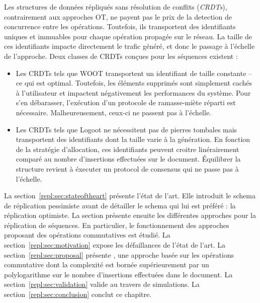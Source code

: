 Les structures de données répliqués sans résolution de conflits (\emph{CRDTs}),
contrairement aux approches OT, ne payent pas le prix de la detection de
concurrence entre les opérations. Toutefois, ils transportent des identifiants
uniques et immuables pour chaque opération propagée sur le réseau. La taille de
ces identifiants impacte directement le trafic généré, et donc le passage à
l'échelle de l'approche. Deux classes de CRDTs conçues pour les séquences
existent :

\begin{itemize}
\item Les CRDTs tels que WOOT transportent un identifiant de taille constante --
ce qui est optimal. Toutefois, les éléments supprimés sont simplement cachés à
l'utilisateur et impactent négativement les performances du système. Pour s'en
débarasser, l'exécution d'un protocole de ramasse-miète réparti est
nécessaire. Malheureusement, ceux-ci ne passent pas à l'échelle.

\item Les CRDTs tels que Logoot ne nécessitent pas de pierres tombales mais
transportent des identifiants dont la taille varie à la génération. En fonction
de la stratégie d'allocation, ces identifiants peuvent croitre linérairement
comparé au nombre d'insertions effectuées sur le document. Équilibrer la
structure revient à éxecuter un protocol de consensus qui ne passe pas à
l'échelle.
\end{itemize}


La section~\ref{repl:sec:stateoftheart} présente l'état de l'art. Elle introduit
le schema de réplication pessimiste avant de détailler le schema qui lui est
préféré : la réplication optimiste. La section présente ensuite les différentes
approches pour la réplication de séquences. En particulier, le fonctionnement
des approches proposant des opérations commutatives est étudié. La
section~\ref{repl:sec:motivation} expose les défaillances de l'état de l'art. La
section~\ref{repl:sec:proposal} présente \LSEQ, une approche basée sur les
opérations commutative dont la complexité est bornée supérieurement par un
polylogarithme sur le nombre d'insertions effectuées dans le document. La
section~\ref{repl:sec:validation} valide \LSEQ au travers de simulations. La
section~\ref{repl:sec:conclusion} conclut ce chapitre.


